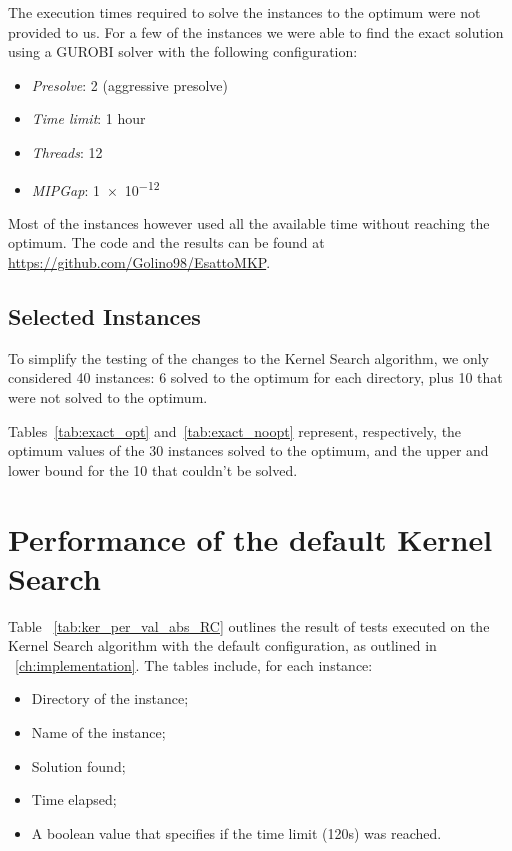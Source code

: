 The execution times required to solve the instances to the optimum were not provided to us.
For a few of the instances we were able to find the exact solution
using a GUROBI solver with the following configuration:

\begin{itemize}
    \item \textit{Presolve}: 2 (aggressive presolve)
    \item \textit{Time limit}: 1 hour
    \item \textit{Threads}: 12
    \item \textit{MIPGap}: \num{1e-12}
\end{itemize}

Most of the instances however used all the available time without reaching the optimum.
The code and the results can be found at \url{https://github.com/Golino98/EsattoMKP}.

\subsection{Selected Instances}\label{subsec:inst}
To simplify the testing of the changes to the Kernel Search algorithm,
we only considered 40 instances: 6 solved to the optimum for each directory,
plus 10 that were not solved to the optimum.

Tables~\ref{tab:exact_opt} and~\ref{tab:exact_noopt} represent,
respectively, the optimum values of the 30 instances solved to
the optimum, and the upper and lower bound for the 10
that couldn't be solved.





\section{Performance of the default Kernel Search}
Table ~\ref{tab:ker_per_val_abs_RC} outlines the result of tests executed on
the Kernel Search algorithm with the default configuration,
as outlined in ~\ref{ch:implementation}.
The tables include, for each instance:
\begin{itemize}
    \item Directory of the instance;
    \item Name of the instance;
    \item Solution found;
    \item Time elapsed;
    \item A boolean value that specifies if the time limit (120s) was reached.
\end{itemize}
